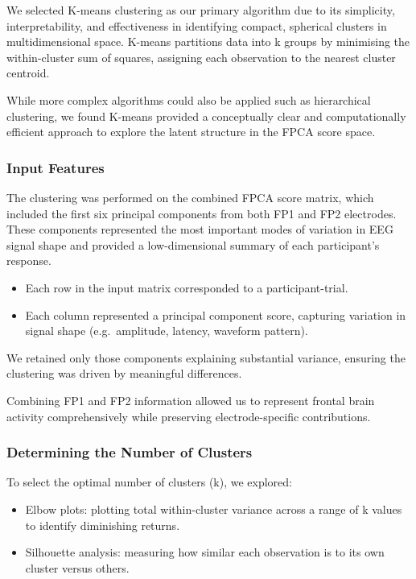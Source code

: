 \documentclass{article}
\begin{document}
We selected K-means clustering as our primary algorithm due to its
simplicity, interpretability, and effectiveness in identifying compact,
spherical clusters in multidimensional space. K-means partitions data
into k groups by minimising the within-cluster sum of squares, assigning
each observation to the nearest cluster centroid.

While more complex algorithms could also be applied such as hierarchical
clustering, we found K-means provided a conceptually clear and
computationally efficient approach to explore the latent structure in
the FPCA score space.

\subsubsection{Input Features}\label{input-features}

The clustering was performed on the combined FPCA score matrix, which
included the first six principal components from both FP1 and FP2
electrodes. These components represented the most important modes of
variation in EEG signal shape and provided a low-dimensional summary of
each participant's response.

\begin{itemize}
\item
  Each row in the input matrix corresponded to a participant-trial.
\item
  Each column represented a principal component score, capturing
  variation in signal shape (e.g.~amplitude, latency, waveform pattern).
\end{itemize}

We retained only those components explaining substantial variance,
ensuring the clustering was driven by meaningful differences.

Combining FP1 and FP2 information allowed us to represent frontal brain
activity comprehensively while preserving electrode-specific
contributions.

\subsubsection{Determining the Number of
Clusters}\label{determining-the-number-of-clusters}

To select the optimal number of clusters (k), we explored:

\begin{itemize}
\item
  Elbow plots: plotting total within-cluster variance across a range of
  k values to identify diminishing returns.
\item
  Silhouette analysis: measuring how similar each observation is to its
  own cluster versus others.
\end{itemize}
\end{document}
